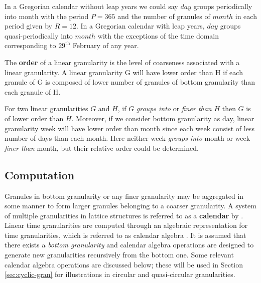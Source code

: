 \documentclass[12pt]{article}
\begin{document}
\begin{example}
{\rm In a Gregorian calendar without leap years we could say $day$ groups periodically into month with the period $P = 365$ and the number of granules of $month$ in each period given by $R=12$. In a Gregorian calendar with leap years, $day$ groups quasi-periodically into $month$ with the exceptions of the time domain corresponding to $29^{\text{th}}$ February of any year.}
\end{example}

\begin{definition}\label{def:order}
The {\bf order} of a linear granularity is the level of coarseness associated with a linear granularity. A linear granularity G will have lower order than H if each granule of G is composed of lower number of granules of bottom granularity than each granule of H.
\end{definition}

\begin{example}
{\rm For two linear granularities $G$ and $H$, if $G$ {\em groups into} or {\em finer than} $H$ then $G$ is of lower order than $H$. Moreover, if we consider bottom granularity as day, linear granularity week will have lower order than month since each week consist of less number of days than each month. Here neither  week {\em groups into} month or  week {\em finer than} month, but their relative order could be determined.}
\end{example}

\hypertarget{computation}{%
\subsection{Computation}\label{computation}}

Granules in bottom granularity or any finer granularity may be aggregated in some manner to form larger granules belonging to a coarser granularity. A system of multiple granularities in lattice structures is referred to as a \textbf{calendar} by \citet{Dyreson_2000}. Linear time granularities are computed through an algebraic representation for time granularities, which is referred to as calendar algebra \citep{Ning_2002}. It is assumed that there exists a \emph{bottom granularity} and calendar algebra operations are designed to generate new granularities recursively from the bottom one. Some relevant calendar algebra operations are discussed below; these will be used in Section \ref{sec:cyclic-gran} for illustrations in circular and quasi-circular granularities.
\end{document}
